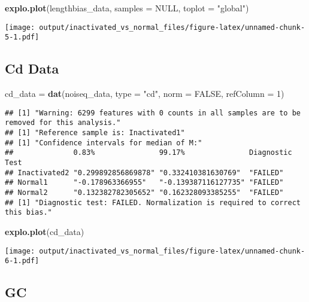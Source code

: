 \documentclass[]{article}
\newenvironment{Shaded}{\begin{snugshade}}{\end{snugshade}}
\newcommand{\KeywordTok}[1]{\textcolor[rgb]{0.13,0.29,0.53}{\textbf{#1}}}
\newcommand{\DataTypeTok}[1]{\textcolor[rgb]{0.13,0.29,0.53}{#1}}
\newcommand{\DecValTok}[1]{\textcolor[rgb]{0.00,0.00,0.81}{#1}}
\newcommand{\StringTok}[1]{\textcolor[rgb]{0.31,0.60,0.02}{#1}}
\newcommand{\OtherTok}[1]{\textcolor[rgb]{0.56,0.35,0.01}{#1}}
\newcommand{\NormalTok}[1]{#1}
\begin{document}
\begin{Shaded}
\begin{Highlighting}[]
\KeywordTok{explo.plot}\NormalTok{(lengthbias_data, }\DataTypeTok{samples =} \OtherTok{NULL}\NormalTok{, }\DataTypeTok{toplot =} \StringTok{"global"}\NormalTok{)}
\end{Highlighting}
\end{Shaded}

\texttt{[image: output/inactivated\_vs\_normal\_files/figure-latex/unnamed-chunk-5-1.pdf]}

\subsection{Cd Data}\label{cd-data}

\begin{Shaded}
\begin{Highlighting}[]
\NormalTok{cd_data =}\StringTok{ }\KeywordTok{dat}\NormalTok{(noiseq_data, }\DataTypeTok{type =} \StringTok{"cd"}\NormalTok{, }\DataTypeTok{norm =} \OtherTok{FALSE}\NormalTok{, }\DataTypeTok{refColumn =} \DecValTok{1}\NormalTok{)}
\end{Highlighting}
\end{Shaded}

\begin{verbatim}
## [1] "Warning: 6299 features with 0 counts in all samples are to be removed for this analysis."
## [1] "Reference sample is: Inactivated1"
## [1] "Confidence intervals for median of M:"
##              0.83%               99.17%               Diagnostic Test
## Inactivated2 "0.299892856869878" "0.332410381630769"  "FAILED"       
## Normal1      "-0.178963366955"   "-0.139387116127735" "FAILED"       
## Normal2      "0.132382782305652" "0.162328093385255"  "FAILED"       
## [1] "Diagnostic test: FAILED. Normalization is required to correct this bias."
\end{verbatim}

\begin{Shaded}
\begin{Highlighting}[]
\KeywordTok{explo.plot}\NormalTok{(cd_data)}
\end{Highlighting}
\end{Shaded}

\texttt{[image: output/inactivated\_vs\_normal\_files/figure-latex/unnamed-chunk-6-1.pdf]}

\subsection{GC}\label{gc}
\end{document}

